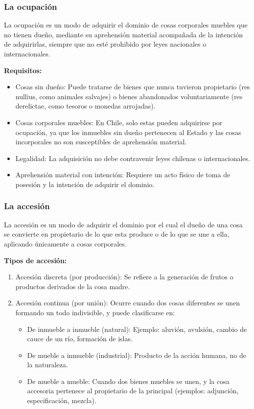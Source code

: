 \documentclass{templateNote}
\begin{document}
\subsubsection{La ocupación}
La ocupación es un modo de adquirir el dominio de cosas corporales muebles que no tienen dueño, mediante su aprehensión material acompañada de la intención de adquirirlas, siempre que no esté prohibido por leyes nacionales o internacionales.

\noindent\textbf{Requisitos:}
\begin{itemize}
    \item Cosas sin dueño: Puede tratarse de bienes que nunca tuvieron propietario (res nullius, como animales salvajes) o bienes abandonados voluntariamente (res derelictae, como tesoros o monedas arrojadas).
    \item Cosas corporales muebles: En Chile, solo estas pueden adquirirse por ocupación, ya que los inmuebles sin dueño pertenecen al Estado y las cosas incorporales no son susceptibles de aprehensión material.
    \item Legalidad: La adquisición no debe contravenir leyes chilenas o internacionales.
    \item Aprehensión material con intención: Requiere un acto físico de toma de posesión y la intención de adquirir el dominio.
\end{itemize}

\subsubsection{La accesión}
La accesión es un modo de adquirir el dominio por el cual el dueño de una cosa se convierte en propietario de lo que esta produce o de lo que se une a ella, aplicando únicamente a cosas corporales.  

\noindent\textbf{Tipos de accesión:}
\begin{enumerate}
    \item Accesión discreta (por producción): Se refiere a la generación de frutos o productos derivados de la cosa madre.  
    \item Accesión continua (por unión): Ocurre cuando dos cosas diferentes se unen formando un todo indivisible, y puede clasificarse en:  
    \begin{itemize}
        \item De inmueble a inmueble (natural): Ejemplo: aluvión, avulsión, cambio de cauce de un río, formación de islas.  
        \item De mueble a inmueble (industrial): Producto de la acción humana, no de la naturaleza.  
        \item De mueble a mueble: Cuando dos bienes muebles se unen, y la cosa accesoria pertenece al propietario de la principal (ejemplos: adjunción, especificación, mezcla).  
    \end{itemize}
\end{enumerate}
\end{document}
